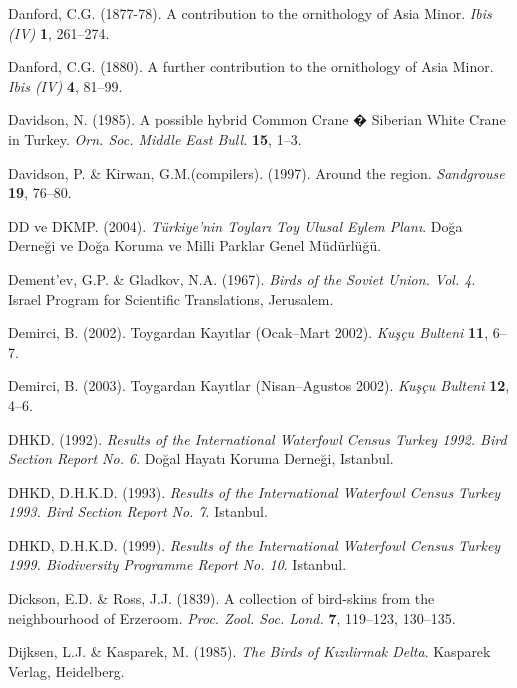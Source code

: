 \documentclass[
  a4paper,
  DIV=11,
  numbers=noendperiod]{scrreprt}
\newlength{\cslhangindent}
\newenvironment{CSLReferences}[2] %
 {\begin{list}{}{%
  \setlength{\itemindent}{0pt}
  \setlength{\leftmargin}{0pt}
  \setlength{\parsep}{0pt}
  \ifodd #1
   \setlength{\leftmargin}{\cslhangindent}
   \setlength{\itemindent}{-1\cslhangindent}
  \fi
  \setlength{\itemsep}{#2\baselineskip}}}
 {\end{list}}
\begin{document}
\begin{CSLReferences}{1}{1}
Danford, C.G. (1877-78). {A contribution to the ornithology of Asia
Minor}. \emph{Ibis (IV)} \textbf{1}, 261--274.

Danford, C.G. (1880). {A further contribution to the ornithology of Asia
Minor}. \emph{Ibis (IV)} \textbf{4}, 81--99.

Davidson, N. (1985). {A possible hybrid Common Crane � Siberian White
Crane in Turkey}. \emph{Orn. Soc. Middle East Bull.} \textbf{15}, 1--3.

Davidson, P. \& Kirwan, G.M.(compilers). (1997). {Around the region}.
\emph{Sandgrouse} \textbf{19}, 76--80.

DD ve DKMP. (2004). \emph{{Türkiye'nin Toyları Toy Ulusal Eylem Planı}}.
Doğa Derneği ve Doğa Koruma ve Milli Parklar Genel Müdürlüğü.

Dement'ev, G.P. \& Gladkov, N.A. (1967). \emph{{Birds of the Soviet
Union. Vol. 4}}. Israel Program for Scientific Translations, Jerusalem.

Demirci, B. (2002). {Toygardan Kayıtlar (Ocak--Mart 2002)}. \emph{Kuşçu
Bulteni} \textbf{11}, 6--7.

Demirci, B. (2003). {Toygardan Kayıtlar (Nisan--Agustos 2002)}.
\emph{Kuşçu Bulteni} \textbf{12}, 4--6.

DHKD. (1992). \emph{{Results of the International Waterfowl Census
Turkey 1992. Bird Section Report No. 6}}. Doğal Hayatı Koruma Derneği,
Istanbul.

DHKD, D.H.K.D. (1993). \emph{{Results of the International Waterfowl
Census Turkey 1993. Bird Section Report No. 7}}. Istanbul.

DHKD, D.H.K.D. (1999). \emph{{Results of the International Waterfowl
Census Turkey 1999. Biodiversity Programme Report No. 10}}. Istanbul.

Dickson, E.D. \& Ross, J.J. (1839). {A collection of bird-skins from the
neighbourhood of Erzeroom}. \emph{Proc. Zool. Soc. Lond.} \textbf{7},
119--123, 130--135.

Dijksen, L.J. \& Kasparek, M. (1985). \emph{{The Birds of Kızılirmak
Delta}}. Kasparek Verlag, Heidelberg.


\end{CSLReferences}
\end{document}
